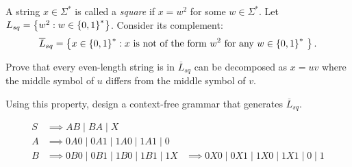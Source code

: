 \begin{problem}
  A string $x \in \Sigma^*$ is called a \emph{square}
  if $x = w^2$ for some $w \in \Sigma^*$.
  Let $L_{sq} = \left\{w^2 : w \in \left\{0, 1\right\}^*\right\}$.
  Consider its complement:
  \[ \overline{L}_{sq} =
    \left\{x \in \left\{0, 1\right\}^* : x
      \text{
        is not of the form $w^2$ for any $w \in \left\{0, 1\right\}^*$
      }
    \right\}.
  \]

  \step
  \begin{enumalph}
    \item Prove that every even-length string is in $\overline{L}_{sq}$
      can be decomposed as $x = uv$ where the middle symbol of $u$
      differs from the middle symbol of $v$.
    \item Using this property, design a context-free grammar that
      generates $\overline{L}_{sq}$.
      \begin{Answer}
        \begin{align*}
          S &\implies AB \mid BA \mid X \\
          A &\implies 0A0 \mid 0A1 \mid 1A0 \mid 1A1 \mid 0 \\
          B &\implies 0B0 \mid 0B1 \mid 1B0 \mid 1B1 \mid 1
          X &\implies 0X0 \mid 0X1 \mid 1X0 \mid 1X1 \mid 0 \mid 1 \\
        \end{align*}
      \end{Answer}
  \end{enumalph}
\end{problem}
